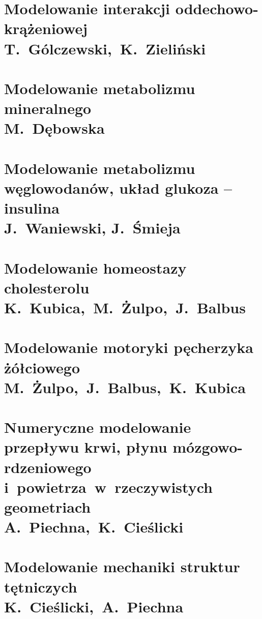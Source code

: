 \documentclass[11pt,a4paper,twoside,openright,final]{memoir}
\begin{document}
			\chapter[Modelowanie interakcji oddechowo-krążeniowej]{Modelowanie interakcji oddechowo-krążeniowej\\{\Large T.~Gólczewski,~K.~Zieliński}}
			
			\chapter[Modelowanie metabolizmu mineralnego]{Modelowanie metabolizmu mineralnego\\{\Large M.~Dębowska}}
			
			\chapter[Modelowanie metabolizmu węglowodanów, układ glukoza – insulina]{Modelowanie metabolizmu węglowodanów, układ glukoza – insulina\\{\Large J.~Waniewski, J.~Śmieja}}
			
			\chapter[Modelowanie homeostazy cholesterolu]{Modelowanie homeostazy cholesterolu\\{\Large K.~Kubica,~M.~Żulpo,~J.~Balbus}}
			
			\chapter[Modelowanie motoryki pęcherzyka żółciowego]{Modelowanie motoryki pęcherzyka żółciowego\\{\Large M.~Żulpo,~J.~Balbus,~K.~Kubica}}
			
			\chapter[Numeryczne modelowanie przepływu krwi, płynu mózgowo-rdzeniowego i~powietrza w rzeczywistych geometriach]{Numeryczne modelowanie przepływu krwi, płynu mózgowo-rdzeniowego i~powietrza~w~rzeczywistych geometriach\\{\Large A.~Piechna,~K.~Cieślicki}}
			
			\chapter[Modelowanie mechaniki struktur tętniczych]{Modelowanie mechaniki struktur tętniczych\\{\Large K.~Cieślicki,~A.~Piechna}}
			
\end{document}
